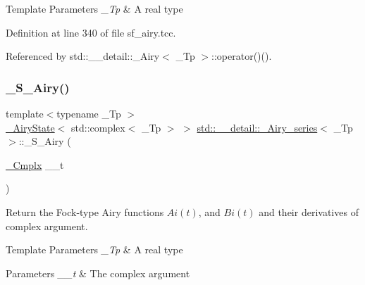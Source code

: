 \begin{DoxyTemplParams}{Template Parameters}
{\em \+\_\+\+Tp} & A real type \\
\hline
\end{DoxyTemplParams}


Definition at line 340 of file sf\+\_\+airy.\+tcc.



Referenced by std\+::\+\_\+\+\_\+detail\+::\+\_\+\+Airy$<$ \+\_\+\+Tp $>$\+::operator()().

\mbox{\label{classstd_1_1____detail_1_1__Airy__series_ae0a269ac8e81f22fe35193b5bb7931ae}} 
\subsubsection{\texorpdfstring{\+\_\+\+S\+\_\+\+Airy()}{\_S\_Airy()}}
{\footnotesize\ttfamily template$<$typename \+\_\+\+Tp $>$ \\
\hyperlink{structstd_1_1____detail_1_1__AiryState}{\+\_\+\+Airy\+State}$<$ std\+::complex$<$ \+\_\+\+Tp $>$ $>$ \hyperlink{classstd_1_1____detail_1_1__Airy__series}{std\+::\+\_\+\+\_\+detail\+::\+\_\+\+Airy\+\_\+series}$<$ \+\_\+\+Tp $>$\+::\+\_\+\+S\+\_\+\+Airy (\begin{DoxyParamCaption}\item[{\hyperlink{classstd_1_1____detail_1_1__Airy__series_ab41161caa54609f4735987fbaed41d9d}{\+\_\+\+Cmplx}}]{\+\_\+\+\_\+t }\end{DoxyParamCaption})\hspace{0.3cm}{\ttfamily [static]}}

Return the Fock-\/type Airy functions $ Ai(t) $, and $ Bi(t) $ and their derivatives of complex argument.


\begin{DoxyTemplParams}{Template Parameters}
{\em \+\_\+\+Tp} & A real type \\
\hline
\end{DoxyTemplParams}

\begin{DoxyParams}{Parameters}
{\em \+\_\+\+\_\+t} & The complex argument \\
\hline
\end{DoxyParams}


